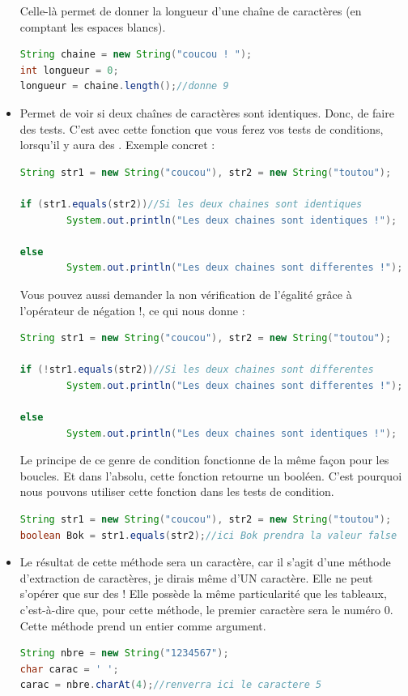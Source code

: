 \documentclass[a4paper,twoside]{article}
\begin{document}
\begin{itemize}
Celle-là permet de donner la longueur d'une chaîne de caractères (en comptant les espaces blancs).
\begin{lstlisting}[language=java]
String chaine = new String("coucou ! "); 
int longueur = 0;
longueur = chaine.length();//donne 9
\end{lstlisting}


\item {}

Permet de voir si deux chaînes de caractères sont identiques. Donc, de faire des tests. C'est avec cette fonction que vous ferez vos tests de conditions, lorsqu'il y aura des . Exemple concret :
\begin{lstlisting}[language=java]
String str1 = new String("coucou"), str2 = new String("toutou");
 
if (str1.equals(str2))//Si les deux chaines sont identiques
        System.out.println("Les deux chaines sont identiques !");
 
else
        System.out.println("Les deux chaines sont differentes !");
\end{lstlisting}


Vous pouvez aussi demander la non vérification de l'égalité grâce à l'opérateur de négation \og !\fg, ce qui nous donne :
\begin{lstlisting}[language=java]
String str1 = new String("coucou"), str2 = new String("toutou");
 
if (!str1.equals(str2))//Si les deux chaines sont differentes
        System.out.println("Les deux chaines sont differentes !");
 
else
        System.out.println("Les deux chaines sont identiques !");
\end{lstlisting}

Le principe de ce genre de condition fonctionne de la même façon pour les boucles. Et dans l'absolu, cette fonction retourne un booléen. C'est pourquoi nous pouvons utiliser cette fonction dans les tests de condition.
\begin{lstlisting}[language=java]
String str1 = new String("coucou"), str2 = new String("toutou");
boolean Bok = str1.equals(str2);//ici Bok prendra la valeur false
\end{lstlisting}

\item {}

Le résultat de cette méthode sera un caractère, car il s'agit d'une méthode d'extraction de caractères, je dirais même d'UN caractère. Elle ne peut s'opérer que sur des ! Elle possède la même particularité que les tableaux, c'est-à-dire que, pour cette méthode, le premier caractère sera le numéro 0. Cette méthode prend un entier comme argument.
\begin{lstlisting}[language=java]
String nbre = new String("1234567");
char carac = ' ';
carac = nbre.charAt(4);//renverra ici le caractere 5
\end{lstlisting}



\end{itemize}
\end{document}

